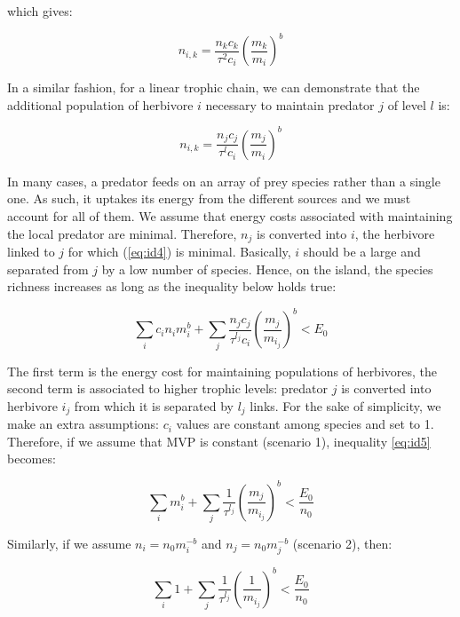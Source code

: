 which gives:

\begin{equation} n_{i,k} = \frac{n_kc_k}{\tau^2 c_i} \left( \frac{m_k}{m_i} \right)^b \label{eq:id3b}\end{equation}

In a similar fashion, for a linear trophic chain, we can demonstrate
that the additional population of herbivore \(i\) necessary to maintain
predator \(j\) of level \(l\) is:

\begin{equation} n_{i,k} = \frac{n_jc_j}{\tau^l c_i} \left( \frac{m_j}{m_i} \right)^b \label{eq:id4}\end{equation}

In many cases, a predator feeds on an array of prey species rather than
a single one. As such, it uptakes its energy from the different sources
and we must account for all of them. We assume that energy costs
associated with maintaining the local predator are minimal. Therefore,
\(n_j\) is converted into \(i\), the herbivore linked to \(j\) for which
(\ref{eq:id4}) is minimal. Basically, \(i\) should be a large and
separated from \(j\) by a low number of species. Hence, on the island,
the species richness increases as long as the inequality below holds
true:

\begin{equation} \sum_i c_in_im_i^b + \sum_j \frac{n_jc_j}{\tau^{l_j} c_i} \left( \frac{m_j}{m_{i_j}} \right)^b < E_0 \label{eq:id5}\end{equation}

The first term is the energy cost for maintaining populations of
herbivores, the second term is associated to higher trophic levels:
predator \(j\) is converted into herbivore \(i_j\) from which it is
separated by \(l_j\) links. For the sake of simplicity, we make an extra
assumptions: \(c_i\) values are constant among species and set to 1.
Therefore, if we assume that MVP is constant (scenario 1), inequality
\ref{eq:id5} becomes:

\begin{equation} \sum_i m_i^b + \sum_j \frac{1}{\tau^{l_j}} \left( \frac{m_j}{m_{i_j}} \right)^b< \frac{E_0}{n_0} \label{eq:id5a}\end{equation}

Similarly, if we assume \(n_i=n_0m_i^{-b}\) and \(n_j=n_0m_j^{-b}\)
(scenario 2), then:

\begin{equation} \sum_i 1 + \sum_j \frac{1}{\tau^{l_j}} \left( \frac{1}{m_{i_j}} \right)^b< \frac{E_0}{n_0} \label{eq:id5b}\end{equation}

